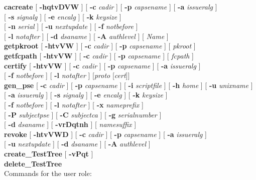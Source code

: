 {\bf cacreate} [ {\bf -hqtvDVW} ] [ {\bf -c} {\em cadir} ] [ {\bf -p} {\em capsename} ] [ {\bf -a} {\em issueralg} ]
             \\ \hspace*{1.6cm} [ {\bf -s} {\em signalg} ] [ {\bf -e} {\em encalg} ] [ {\bf -k} {\em keysize} ]
             \\ \hspace*{1.6cm} [ {\bf -n} {\em serial} ] [ {\bf -u} {\em nextupdate} ] [ {\bf -f} {\em notbefore} ]
	     \\ \hspace*{1.6cm} [ {\bf -l} {\em notafter} ] [ {\bf -d} {\em dsaname} ] [ {\bf -A} {\em authlevel} ] [ {\em Name} ] \\
{\bf getpkroot} [ {\bf -htvVW} ] [ {\bf -c} {\em cadir} ] [ {\bf -p} {\em capsename} ] [ {\em pkroot} ] \\
{\bf getfcpath} [ {\bf -htvVW} ] [ {\bf -c} {\em cadir} ] [ {\bf -p} {\em capsename} ] [ {\em fcpath} ] \\
{\bf certify} [ {\bf -htvVW} ] [ {\bf -c} {\em cadir} ] [ {\bf -p} {\em capsename} ] [ {\bf -a} {\em issueralg} ] \\
\hspace*{1.6cm} [ {\bf -f} {\em notbefore} ] [ {\bf -l} {\em notafter} ] [{\em proto} [{\em cert}]] \\
{\bf gen\_pse} [ {\bf -c} {\em cadir} ] [ {\bf -p} {\em capsename} ] [ {\bf -i} {\em scriptfile} ] [ {\bf -h} {\em 
home} ] [ {\bf -u} {\em unixname} ] \\ 
\hspace*{1.6cm} [ {\bf -a} {\em issueralg} ] [ {\bf -s} {\em signalg} ] [ {\bf -e} {\em encalg} ] [ {\bf -k} {\em 
keysize} ] \\ 
\hspace*{1.6cm} [ {\bf -f} {\em notbefore} ] [ {\bf -l} {\em notafter} ] [ {\bf -x} {\em nameprefix} ]  \\ 
\hspace*{1.6cm} [ {\bf -P} {\em subjectpse} ] [ {\bf -C} {\em subjectca} ] [ {\bf -g} {\em serialnumber} ] \\
\hspace*{1.6cm} [ {\bf -d} {\em dsaname} ] [ {\bf -vrDqtnh} ] [ {\em namesuffix} ] \\
{\bf revoke} [ {\bf -htvVWD} ] [ {\bf -c} {\em cadir} ] [ {\bf -p} {\em capsename} ] [ {\bf -a} {\em issueralg} ] 
             \\ \hspace*{1.6cm} [ {\bf -u} {\em nextupdate} ] [ {\bf -d} {\em dsaname} ] [ {\bf -A} {\em authlevel} ] \\
{\bf create\_TestTree} [ {\bf -vPqt} ] \\
{\bf delete\_TestTree}
\\ [1em]
Commands for the user role:

